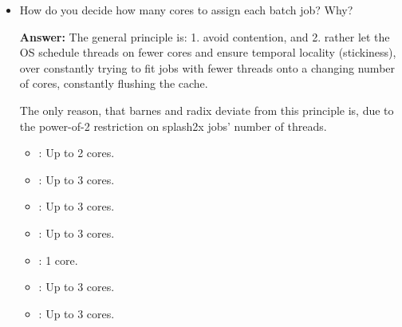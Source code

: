 \begin{enumerate}
\begin{itemize}
    \textbf{Answer:}
    The controller monitors aggregate CPU utilization across all cores assigned to memcached (core 0 plus leftover cores among cores 1--3). If utilization exceeds $90\% \cdot N_\text{cores}$, it gives memcached 2 additional cores; if it exceeds $80\% \cdot N_\text{cores}$, it gives 1 additional core. Memcached only returns a core to the batch jobs when \textit{post-drop} utilization would be below $70\%$, i.e current utilization less than $70\% \cdot (N_\text{cores} - 1)$, meaning memcached could sustain its load with one fewer core. The threshold asymmetry prevents oscillation and thrashing – ensures utilization stays between $70\%$ -- $80\%$ per core.

    Cores are allocated \textit{stickily}, e.g. suppose memcached runs on core 0, barnes runs on cores 1-2, and radix runs on core 3; if the controller determines memcached needs one more core, memcached will run on cores {0,3}; there is never unnecessary shuffling of cores.
    \\

    \item How do you decide how many cores to assign each batch job? Why?

    \textbf{Answer:}
    The general principle is: 1. avoid contention, and 2. rather let the OS schedule threads on fewer cores and ensure temporal locality (stickiness), over constantly trying to fit jobs with fewer threads onto a changing number of cores, constantly flushing the cache.
    
    The only reason, that barnes and radix deviate from this principle is, due to the power-of-2 restriction on splash2x jobs' number of threads.
    \begin{itemize}
        \item {}: Up to 2 cores. 

        \item {}: Up to 3 cores.

        \item {}: Up to 3 cores.

        \item {}: Up to 3 cores. 

        \item {}: 1 core.

        \item {}: Up to 3 cores. 

        \item {}: Up to 3 cores.
        \\
    \end{itemize}



\end{itemize}
\end{enumerate}
